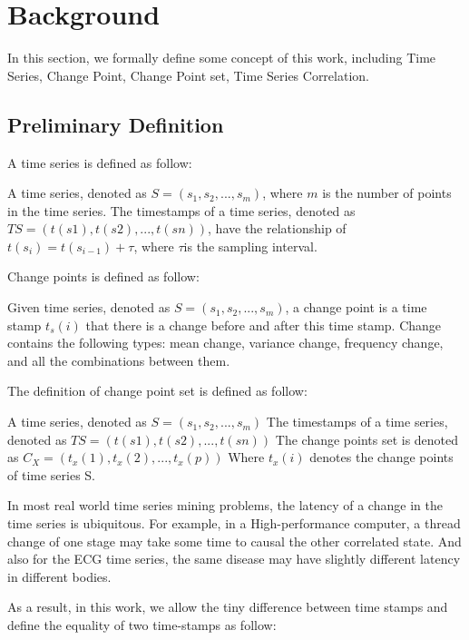 \section{Background}
\label{sec:formulation}
In this section, we formally define some concept of this work, including Time Series, Change Point, Change Point set, Time Series Correlation.

\subsection{Preliminary Definition}

A time series is defined as follow:
\begin{definition}
A time series, denoted as $S = (s_1,s_2,...,s_m)$, where $m$ is the number of points in the time series. The timestamps of a time series, denoted as $TS = (t(s1), t(s2),..., t(sn))$, have the relationship of $t(s_i) = t(s_{i-1})+\tau$, where $\tau$is the sampling interval.
\end{definition}

Change points is defined as follow:
\begin{definition}
Given time series, denoted as $S = (s_1,s_2,...,s_m)$, a change point is a time stamp $t_s(i)$ that there is a change before and after this time stamp. Change contains the following types: mean change, variance change, frequency change, and all the combinations between them.
\end{definition}

The definition of change point set is defined as follow:
\begin{definition}
A time series, denoted as
$S = (s_1,s_2,...,s_m)$
The timestamps of a time series, denoted as 
$TS = (t(s1), t(s2),..., t(sn))$
The change points set is denoted as 
$C_X=(t_x(1),t_x(2),...,t_x(p))$
Where $t_x(i)$ denotes the change points of time series S.
\end{definition}

In most real world time series mining problems, the latency of a change in the time series is ubiquitous.
For example, in a High-performance computer, a thread change of one stage may take some time to causal the other correlated state. And also for the ECG time series, the same disease may have slightly different latency in different bodies.

As a result, in this work, we allow the tiny difference between time stamps and define the equality of two time-stamps as follow:

